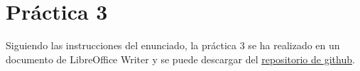 \part{Práctica 3}
Siguiendo las instrucciones del enunciado, la práctica 3 se ha realizado en un documento de LibreOffice Writer y se puede descargar del \href{http://www.google.es}{repositorio de github}.